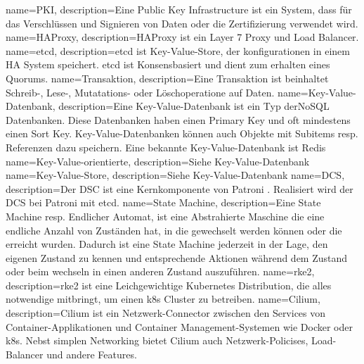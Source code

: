 {
        name=PKI,
        description={Eine Public Key Infrastructure ist ein System, dass für das Verschlüssen und Signieren von Daten oder die Zertifizierung verwendet wird.}
}
{
        name=HAProxy,
        description={HAProxy ist ein Layer 7 Proxy und Load Balancer\cite{U6F2DWTQ}.}
}
{
        name=etcd,
        description={etcd ist \Gls{Key-Value-Store}, der konfigurationen in einem HA System speichert.
        etcd ist Konsensbasiert und dient zum erhalten eines \Gls{Quorum}s\cite{8A4R4E2D}.}
}
{
        name=Transaktion,
        description={Eine Transaktion ist beinhaltet Schreib-, Lese-, Mutatations- oder Löschoperatione auf Daten.}
}
{
        name=Key-Value-Datenbank,
        description={Eine Key-Value-Datenbank ist ein Typ der\Gls{NoSQL} Datenbanken.
        Diese Datenbanken haben einen Primary Key und oft mindestens einen Sort Key.
        Key-Value-Datenbanken können auch Objekte mit Subitems resp. Referenzen dazu speichern.
        Eine bekannte Key-Value-Datenbank ist \Gls{Redis}}
}
{
        name=Key-Value-orientierte,
        description={Siehe \Gls{Key-Value-Datenbank}}
}
{
        name=Key-Value-Store,
        description={Siehe \Gls{Key-Value-Datenbank}}
}
{
        name=DCS,
        description={Der DSC ist eine Kernkomponente von Patroni \cite{LVMUNS8P}.
        Realisiert wird der DCS bei Patroni mit \Gls{etcd}.}
}
{
        name=State Machine,
        description={Eine State Machine resp. Endlicher Automat, ist eine Abstrahierte Maschine die eine endliche Anzahl von Zuständen hat, in die gewechselt werden können oder die erreicht wurden.
        Dadurch ist eine State Machine jederzeit in der Lage, den eigenen Zustand zu kennen und entsprechende Aktionen während dem Zustand oder beim wechseln in einen anderen Zustand auszuführen.}
}
{
        name=rke2,
        description={rke2 ist eine Leichgewichtige Kubernetes Distribution, die alles notwendige mitbringt, um einen k8s Cluster zu betreiben\cite{F59M6UU2}.}
}
{
        name=Cilium,
        description={Cilium ist ein Netzwerk-Connector zwischen den Services von Container-Applikationen und Container Management-Systemen wie Docker oder k8s.
        Nebst simplen Networking bietet Cilium auch Netzwerk-Policises, Load-Balancer und andere Features\cite{YH7CFGP5,647E9FLZ}.}
}
